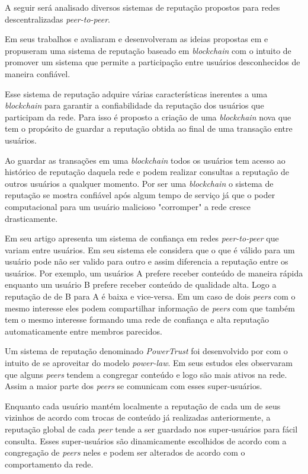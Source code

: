 \documentclass[12pt]{article}
\newcommand{\PtoP} {\emph{peer-to-peer}\xspace}
\begin{document}
A seguir será analisado diversos sistemas de reputação propostos para redes descentralizadas \PtoP.

Em seus trabalhos \cite{dennis2015rep} e \cite{dennis2016rep} avaliaram e desenvolveram as ideias propostas em \cite{nakamoto2008peer} e propuseram uma sistema de reputação baseado em \emph{blockchain} com o intuito de promover um sistema que permite a participação entre usuários desconhecidos de maneira confiável. 

Esse sistema de reputação adquire várias características inerentes a uma \emph{blockchain} para garantir a confiabilidade da reputação dos usuários que participam da rede. Para isso é proposto a criação de uma \emph{blockchain} nova que tem o propósito de guardar a reputação obtida ao final de uma transação entre usuários.

Ao guardar as transações em uma \emph{blockchain} todos os usuários tem acesso ao histórico de reputação daquela rede e podem realizar consultas a reputação de outros usuários a qualquer momento. Por ser uma \emph{blockchain} o sistema de reputação se mostra confiável após algum tempo de serviço já que o poder computacional para um usuário malicioso "corromper" a rede cresce drasticamente.

Em seu artigo \cite{1231515} apresenta um sistema de confiança em redes \PtoP que variam entre usuários. Em seu sistema ele considera que o que é válido para um usuário pode não ser valido para outro e assim diferencia a reputação entre os usuários. Por exemplo, um usuários A prefere receber conteúdo de maneira rápida enquanto um usuário B prefere receber conteúdo de qualidade alta. Logo a reputação de de B para A é baixa e vice-versa. Em um caso de dois \emph{peers} com o mesmo interesse eles podem compartilhar informação de \emph{peers} com que também tem o mesmo interesse formando uma rede de confiança e alta reputação automaticamente entre membros parecidos.

Um sistema de reputação denominado \emph{PowerTrust} foi desenvolvido por \cite{zhou2007powertrust} com o intuito de se aproveitar do modelo \emph{power-law}. Em seus estudos eles observaram que alguns \emph{peers} tendem a congregar conteúdo e logo são mais ativos na rede. Assim a maior parte dos \emph{peers} se comunicam com esses super-usuários. 

Enquanto cada usuário mantém localmente a reputação de cada um de seus vizinhos de acordo com trocas de conteúdo já realizadas anteriormente, a reputação global de cada \emph{peer} tende a ser guardado nos super-usuários para fácil consulta. Esses super-usuários são dinamicamente escolhidos de acordo com a congregação de \emph{peers} neles e podem ser alterados de acordo com o comportamento da rede.
\end{document}
